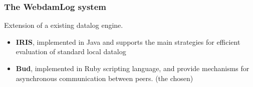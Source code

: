 \documentclass{beamer}
\begin{document}
\frame
{
	\frametitle{The WebdamLog system}
	
	Extension of a existing datalog engine.
	\begin{itemize}
		\item \textbf{IRIS}, implemented in Java and supports the main strategies for efficient evaluation of standard local datalog
		\item \textbf{Bud}, implemented in Ruby scripting language, and provide mechanisms for asynchronous communication between peers. (the chosen)
	\end{itemize}

}
\end{document}
